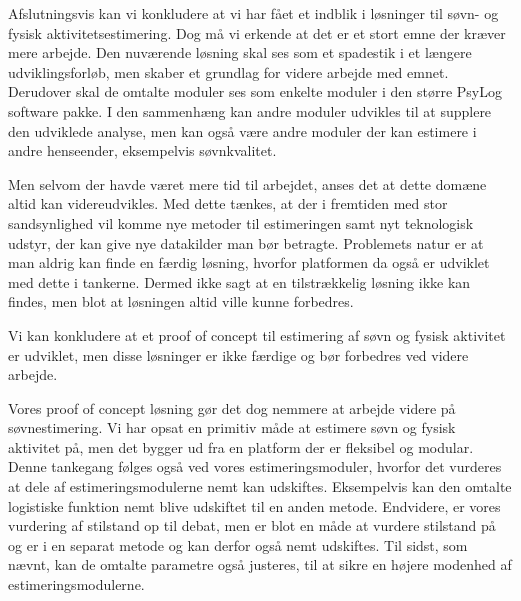 Afslutningsvis kan vi konkludere at vi har fået et indblik i løsninger til søvn- og fysisk aktivitetsestimering.
Dog må vi erkende at det er et stort emne der kræver mere arbejde.
Den nuværende løsning skal ses som et spadestik i et længere udviklingsforløb, men skaber et grundlag for videre arbejde med emnet.
Derudover skal de omtalte moduler ses som enkelte moduler i den større PsyLog software pakke.
I den sammenhæng kan andre moduler udvikles til at supplere den udviklede analyse, men kan også være andre moduler der kan estimere i andre henseender, eksempelvis søvnkvalitet.


Men selvom der havde været mere tid til arbejdet, anses det at dette domæne altid kan videreudvikles.
Med dette tænkes, at der i fremtiden med stor sandsynlighed vil komme nye metoder til estimeringen samt nyt teknologisk udstyr, der kan give nye datakilder man bør betragte.
Problemets natur er at man aldrig kan finde en færdig løsning, hvorfor platformen da også er udviklet med dette i tankerne.
Dermed ikke sagt at en tilstrækkelig løsning ikke kan findes, men blot at løsningen altid ville kunne forbedres.

Vi kan konkludere at et proof of concept til estimering af søvn og fysisk aktivitet er udviklet, men disse løsninger er ikke færdige og bør forbedres ved videre arbejde.

Vores proof of concept løsning gør det dog nemmere at arbejde videre på søvnestimering.
Vi har opsat en primitiv måde at estimere søvn og fysisk aktivitet på, men det bygger ud fra en platform der er fleksibel og modular.
Denne tankegang følges også ved vores estimeringsmoduler, hvorfor det vurderes at dele af estimeringsmodulerne nemt kan udskiftes.
Eksempelvis kan den omtalte logistiske funktion nemt blive udskiftet til en anden metode.
Endvidere, er vores vurdering af stilstand op til debat, men er blot en måde at vurdere stilstand på og er i en separat metode og kan derfor også nemt udskiftes. 
Til sidst, som nævnt, kan de omtalte parametre også justeres, til at sikre en højere modenhed af estimeringsmodulerne.



